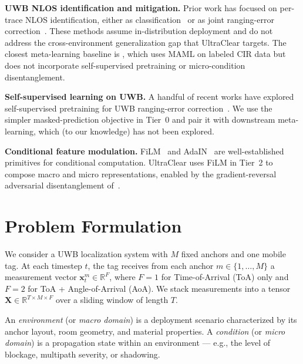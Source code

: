 \documentclass[11pt,letterpaper]{article}
\newcommand{\R}{\mathbb{R}}
\begin{document}
\textbf{UWB NLOS identification and mitigation.}
Prior work has focused on per-trace NLOS identification,
either as classification~\cite{bregar2023, fbert2025,
adcnnbilstm2025, hsml2025} or as joint ranging-error
correction~\cite{transformerwls2025, refloc2024}. These
methods assume in-distribution deployment and do not address
the cross-environment generalization gap that UltraClear
targets. The closest meta-learning baseline is
\cite{hsml2025}, which uses MAML on labeled CIR data but
does not incorporate self-supervised pretraining or
micro-condition disentanglement.

\textbf{Self-supervised learning on UWB.}
A handful of recent works have explored self-supervised
pretraining for UWB ranging-error correction~\cite{bregar2023,
coppens2024}. We use the simpler masked-prediction objective
in Tier~0 and pair it with downstream meta-learning, which
(to our knowledge) has not been explored.

\textbf{Conditional feature modulation.}
FiLM~\cite{film2018} and AdaIN~\cite{adain2017} are
well-established primitives for conditional computation.
UltraClear uses FiLM in Tier~2 to compose macro and
micro representations, enabled by the gradient-reversal
adversarial disentanglement of~\cite{dann2016}.

\section{Problem Formulation}
\label{sec:problem}

We consider a UWB localization system with $M$ fixed anchors and one
mobile tag. At each timestep $t$, the tag receives from each anchor
$m \in \{1,\dots,M\}$ a measurement vector
$\bm{x}_t^m \in \R^{F}$, where $F = 1$ for Time-of-Arrival (ToA)
only and $F = 2$ for ToA + Angle-of-Arrival (AoA). We stack
measurements into a tensor
$\bm{X} \in \R^{T \times M \times F}$ over a sliding window of
length $T$.

An \emph{environment} (or \emph{macro domain}) is a deployment
scenario characterized by its anchor layout, room geometry, and
material properties. A \emph{condition} (or \emph{micro domain}) is
a propagation state within an environment --- e.g., the level of
blockage, multipath severity, or shadowing.
\end{document}
